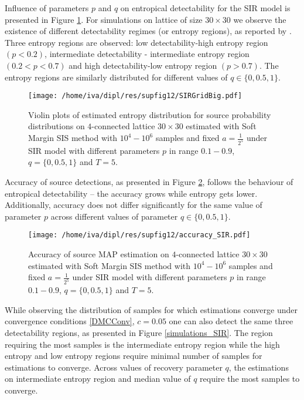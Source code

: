 \documentclass[times, utf8, diplomski]{fer}
\begin{document}
Influence of parameters $p$ and $q$ on entropical detectability for the SIR model is presented in Figure \ref{entropy_zones}. For simulations on lattice of size $30 \times 30$  we observe the existence of different detectability regimes (or entropy regions), as reported by \citet{Nino}.  Three entropy regions are observed: low detectability-high entropy region $(p < 0.2)$, intermediate detectability - intermediate entropy region $(0.2 < p < 0.7)$ and high detectability-low entropy region $(p > 0.7)$.  The entropy regions are similarly distributed for different  values of $q \in \{0, 0.5, 1\}$.

\begin{figure}[H]
\center
\texttt{[image: /home/iva/dipl/res/supfig12/SIRGridBig.pdf]}
\caption{Violin plots of estimated entropy distribution for source probability distributions on  $4$-connected lattice $30 \times 30$ estimated with Soft Margin SIS method with $10^4 - 10^6$ samples and fixed $a=\frac{1}{2^5}$ under  SIR model with different parameters $p$ in range $0.1 - 0.9$, $q = \{0, 0.5, 1\}$ and $T = 5$. }
\label{entropy_zones}
\end{figure}

\newpage
Accuracy of source detections, as presented in Figure \ref{accuracy_SIR}, follows the behaviour of entropical detectability -- the accuracy grows while entropy gets lower. Additionally, accuracy does not differ significantly for the same value of parameter $p$ across different values of parameter $q \in \{0, 0.5, 1\}$. 

\begin{figure}[H]
\center
\texttt{[image: /home/iva/dipl/res/supfig12/accuracy\_SIR.pdf]}
\caption{Accuracy of source MAP estimation  on $4$-connected lattice $30 \times 30$ estimated with Soft Margin SIS method with $10^4 - 10^6$ samples and fixed $a=\frac{1}{2^5}$ under SIR  model with different parameters $p$ in range $0.1 - 0.9$,  $q = \{0, 0.5, 1\}$ and $T = 5$.}
\label{accuracy_SIR}
\end{figure}

While observing the distribution of samples for which estimations converge under convergence conditions \ref{DMCConv}, $c=0.05$ one can also detect the same three detectability regions, as presented in Figure \ref{simulations_SIR}. The region requiring the most samples is the intermediate entropy region while the high entropy and low entropy regions require minimal number of samples for estimations to converge. Across values of recovery parameter $q$, the estimations on intermediate entropy region  and median value of $q$ require the most samples to converge.
\end{document}
